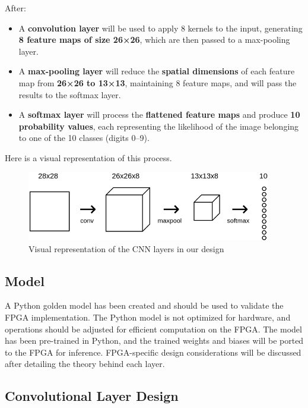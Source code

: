 \documentclass{article}
\begin{document}
After:
\begin{itemize}
  \item A \textbf{convolution layer} will be used to apply 8 kernels to the input, generating \textbf{8 feature maps of size 26×26}, which are then passed to a max-pooling layer.
  \item A \textbf{max-pooling layer} will reduce the \textbf{spatial dimensions} of each feature map from \textbf{26×26 to 13×13}, maintaining 8 feature maps, and will pass the results to the softmax layer.
  \item A \textbf{softmax layer} will process the \textbf{flattened feature maps} and produce \textbf{10 probability values}, each representing the likelihood of the image belonging to one of the 10 classes (digits 0–9).
\end{itemize}

Here is a visual representation of this process.

\begin{figure}[H]
  \begin{center}
    \includegraphics[width=0.95\textwidth]{figures/arch_vis}
  \end{center}
  \caption{Visual representation of the CNN layers in our design}\label{fig:cnn_arch}
\end{figure}

\subsection{Model}
A Python golden model has been created and should be used to validate the FPGA implementation. The Python model is not optimized for hardware, and operations should be adjusted for efficient computation on the FPGA. The model has been pre-trained in Python, and the trained weights and biases will be ported to the FPGA for inference. FPGA-specific design considerations will be discussed after detailing the theory behind each layer.

\subsection{Convolutional Layer Design}
\end{document}
